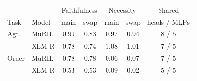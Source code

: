 \begin{tabular}{@{}llccccc@{}}
\toprule
 & & \multicolumn{2}{c}{Faithfulness} & \multicolumn{2}{c}{Necessity} & Shared \\
Task & Model & main & swap & main & swap & heads / MLPs \\
\midrule
Agr. & MuRIL & 0.90 & 0.83 & 0.97 & 0.94 & 8 / 5 \\
 & XLM-R & 0.78 & 0.74 & 1.08 & 1.01 & 7 / 5 \\
Order & MuRIL & 0.78 & 0.78 & 0.06 & 0.07 & 7 / 5 \\
 & XLM-R & 0.53 & 0.53 & 0.09 & 0.02 & 5 / 5 \\
\bottomrule
\end{tabular}
